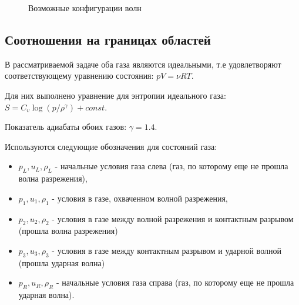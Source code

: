 \documentclass[a4paper,12pt]{extarticle}
\begin{document}
\begin{figure}[h]
\begin{minipage}[h]{0.32\linewidth}
\end{minipage}
\hfill
\begin{minipage}[h]{0.32\linewidth}
\end{minipage}
\caption{Возможные конфигурации волн}
\label{fig:Sod 2 moments}
\end{figure}

\subsection{Соотношения на границах областей} \label{sec: relations bound}
В рассматриваемой задаче оба газа являются идеальными, т.е удовлетворяют соответствующему уравнению состояния: $ pV = \nu RT$.

Для них выполнено уравнение для энтропии идеального газа: $S = C_v\log(p/\rho^\gamma)+const$.

Показатель адиабаты обоих газов: $\gamma = 1.4$.

Используются следующие обозначения для состояний газа:
\begin{itemize}
    \item $p_L, u_L, \rho_L$ - начальные условия газа слева (газ, по которому еще не прошла волна разрежения),
    \item $p_1, u_1, \rho_1$ - условия в газе, охваченном волной разрежения,
    \item $p_2, u_2, \rho_2$ - условия в газе между волной разрежения и контактным разрывом (прошла волна разрежения)
    \item $p_3, u_3, \rho_3$ - условия в газе между контактным разрывом и ударной волной (прошла ударная волна)
    \item $p_R, u_R, \rho_R$ - начальные условия газа справа (газ, по которому еще не прошла ударная волна).
\end{itemize}
\end{document}
